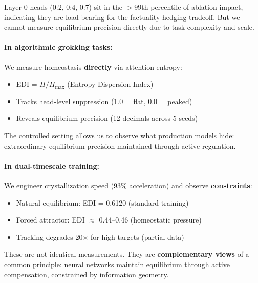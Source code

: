 Layer-0 heads (0:2, 0:4, 0:7) sit in the $>99$th percentile of ablation impact, indicating they are load-bearing for the factuality-hedging tradeoff. But we cannot measure equilibrium precision directly due to task complexity and scale.

\paragraph{In algorithmic grokking tasks:}
We measure homeostasis \textbf{directly} via attention entropy:
\begin{itemize}
\item EDI = $H / H_{\text{max}}$ (Entropy Dispersion Index)
\item Tracks head-level suppression (1.0 = flat, 0.0 = peaked)
\item Reveals equilibrium precision (12 decimals across 5 seeds)
\end{itemize}

The controlled setting allows us to observe what production models hide: extraordinary equilibrium precision maintained through active regulation.

\paragraph{In dual-timescale training:}
We engineer crystallization speed (93\% acceleration) and observe \textbf{constraints}:
\begin{itemize}
\item Natural equilibrium: EDI = 0.6120 (standard training)
\item Forced attractor: EDI $\approx$ 0.44--0.46 (homeostatic pressure)
\item Tracking degrades 20× for high targets (partial data)
\end{itemize}

These are not identical measurements. They are \textbf{complementary views} of a common principle: neural networks maintain equilibrium through active compensation, constrained by information geometry.

